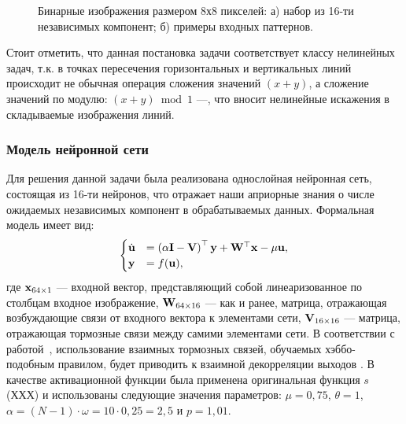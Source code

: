 \begin{figure}[ht]
    \caption{Бинарные изображения размером 8х8 пикселей: а) набор из 16-ти независимых компонент; б) примеры входных паттернов.}
    \label{img:ica_patterns}
\end{figure}

Стоит отметить, что данная постановка задачи соответствует классу нелинейных задач, т.к. в точках пересечения горизонтальных и вертикальных линий происходит не обычная операция сложения значений $(x + y)$, а сложение значений по модулю: $(x + y) \bmod 1$ ---, что вносит нелинейные искажения в складываемые изображения линий.

\subsubsection{Модель нейронной сети}

Для решения данной задачи была реализована однослойная нейронная сеть, состоящая из 16-ти нейронов, что отражает наши априорные знания о числе ожидаемых независимых компонент в обрабатываемых данных. Формальная модель  имеет вид:
\begin{equation}
    \nonumber
    \begin{cases}
        \dot{\mathrm{\mathbf{u}}} &= \left(\alpha \mathrm{\mathbf{I}} - \mathrm{\mathbf{V}} \right)^{\top} \mathrm{\mathbf{y}} + \mathrm{\mathbf{W}}^{\top} \mathrm{\mathbf{x}} - \mu \mathrm{\mathbf{u}},\\
        \mathrm{\mathbf{y}}       &= f(\mathrm{\mathbf{u}}),
    \end{cases}
\end{equation}
где $\mathrm{\mathbf{x}}_{64 \times 1}$ --- входной вектор, представляющий собой линеаризованное по столбцам входное изображение, $\mathrm{\mathbf{W}}_{64 \times 16}$ --- как и ранее, матрица, отражающая возбуждающие связи от входного вектора к элементами сети, $\mathrm{\mathbf{V}}_{16 \times 16}$ --- матрица, отражающая тормозные связи между самими элементами сети. В соответствии с работой~\cite{Fyfe2007}, использование взаимных тормозных связей, обучаемых хэббо-подобным правилом, будет приводить к взаимной декорреляции выходов . В качестве активационной функции была применена оригинальная функция $s$ (ХХХ) и использованы следующие значения параметров: $\mu = 0,75$, $\theta = 1$, $\alpha = (N - 1) \cdot \omega = 10 \cdot 0,25 = 2,5$ и $p = 1,01$.

